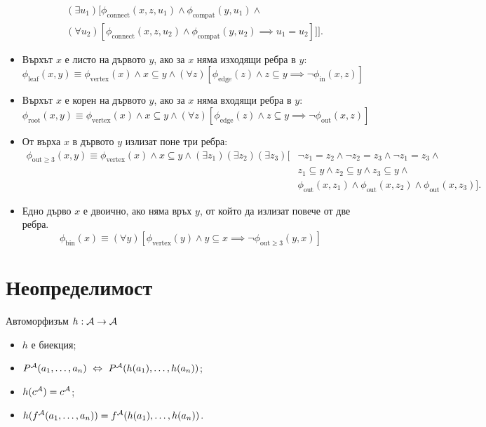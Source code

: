 \begin{problem}
\begin{itemize}
\begin{align*}
                                 & (\exists u_1)[\phi_{\text{connect}}(x,z,u_1) \land \phi_{\text{compat}}(y,u_1) \land \\
                                 & (\forall u_2)[\phi_{\text{connect}}(x,z,u_2) \land \phi_{\text{compat}}(y,u_2) \implies u_1 = u_2]]].
    \end{align*}
  \item
    Върхът $x$ е листо на дървото $y$, ако за $x$ няма изходящи ребра в $y$:
    \[\phi_{\text{leaf}}(x,y) \equiv \phi_{\text{vertex}}(x) \land x \subseteq y \land (\forall z)[\phi_{\text{edge}}(z) \land z \subseteq y \implies \neg \phi_{\text{in}}(x,z)]\]
  \item
    Върхът $x$ е корен на дървото $y$, ако за $x$ няма входящи ребра в $y$:
    \[\phi_{\text{root}}(x,y) \equiv \phi_{\text{vertex}}(x) \land x \subseteq y \land (\forall z)[\phi_{\text{edge}}(z) \land z \subseteq y \implies \neg \phi_{\text{out}}(x,z)]\]
  \item
    От върха $x$ в дървото $y$ излизат поне три ребра:
    \begin{align*}
      \phi_{\text{out}\geq 3}(x,y) \equiv \phi_{\text{vertex}}(x) \land x \subseteq y \land (\exists z_1)(\exists z_2)(\exists z_3)[ & \neg z_1 = z_2 \land \neg z_2 = z_3 \land \neg z_1 = z_3 \land \\
                                                                                                                       & z_1 \subseteq y \land z_2 \subseteq y \land z_3 \subseteq y \land\\
                                                                                                                       & \phi_{\text{out}}(x,z_1) \land \phi_{\text{out}}(x,z_2) \land \phi_{\text{out}}(x,z_3)].
    \end{align*}
  \item
    Едно дърво $x$ е двоично, ако няма връх $y$, от който да излизат повече от две ребра.
    \[\phi_{\text{bin}}(x) \equiv (\forall y)[\phi_{\text{vertex}}(y) \land y \subseteq x \implies \neg \phi_{\text{out}\geq 3}(y,x)]\]
  \end{itemize}
  
\end{problem}
  
\section{Неопределимост}

Автоморфизъм $h : \mathcal{A} \to \mathcal{A}$
\begin{itemize}
\item
  $h$ е биекция;
\item
  $P^{\mathcal{A}}(a_1,\dots,a_n) \ \Leftrightarrow\  P^{\mathcal{A}}(h(a_1),\dots,h(a_n))$;
\item
  $h(c^{\mathcal{A}}) = c^{\mathcal{A}}$;
\item
  $h(f^{\mathcal{A}}(a_1,\dots,a_n)) = f^{\mathcal{A}}(h(a_1),\dots,h(a_n))$.
\end{itemize}

